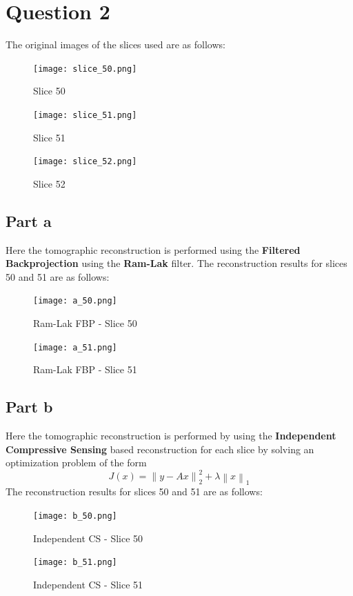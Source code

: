 \documentclass[12pt]{article}
\newcommand{\norm}[1]{\left\lVert #1 \right\rVert}
\begin{document}
\section*{Question 2}
The original images of the slices used are as follows:
\begin{figure}[ht]
	\centering
	\begin{minipage}[bt]{0.3\linewidth}
		\centering
		\texttt{[image: slice\_50.png]}
		\caption{Slice 50}
	\end{minipage}
	\begin{minipage}[bt]{0.3\linewidth}
		\centering
		\texttt{[image: slice\_51.png]}
		\caption{Slice 51}
	\end{minipage}
	\begin{minipage}[bt]{0.3\linewidth}
		\centering
		\texttt{[image: slice\_52.png]}
		\caption{Slice 52}
	\end{minipage}
\end{figure}
\subsection*{Part a}
Here the tomographic reconstruction is performed using the \textbf{Filtered Backprojection} using the \textbf{Ram-Lak} filter. The reconstruction results for slices 50 and 51 are as follows:
\begin{figure}[ht]
	\centering
	\begin{minipage}[bt]{0.5\linewidth}
		\centering
		\texttt{[image: a\_50.png]}
		\caption{Ram-Lak FBP - Slice 50}
	\end{minipage}
	\begin{minipage}[bt]{0.4\linewidth}
		\centering
		\texttt{[image: a\_51.png]}
		\caption{Ram-Lak FBP - Slice 51}
	\end{minipage}
\end{figure}
\subsection*{Part b}
Here the tomographic reconstruction is performed by using the \textbf{Independent Compressive Sensing} based reconstruction for each slice by solving an optimization problem of the form
$$J(x) = \norm{y - Ax}_2^2 + \lambda \norm{x}_1$$
The reconstruction results for slices 50 and 51 are as follows:
\begin{figure}[ht]
	\centering
	\begin{minipage}[bt]{0.5\linewidth}
		\centering
		\texttt{[image: b\_50.png]}
		\caption{Independent CS - Slice 50}
	\end{minipage}
	\begin{minipage}[bt]{0.4\linewidth}
		\centering
		\texttt{[image: b\_51.png]}
		\caption{Independent CS - Slice 51}
	\end{minipage}
\end{figure}
\end{document}
